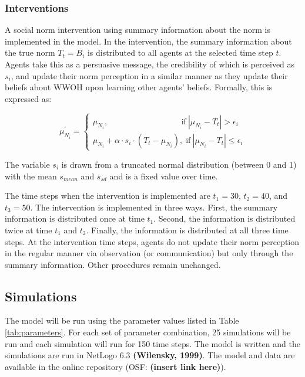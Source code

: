 \documentclass[
  11pt,
]{article}
\begin{document}
\hypertarget{interventions}{%
\subsubsection{Interventions}\label{interventions}}

A social norm intervention using summary information about the norm is
implemented in the model. In the intervention, the summary information
about the true norm \(T_t = \overline{B_i}\) is distributed to all
agents at the selected time step \(t\). Agents take this as a persuasive
message, the credibility of which is perceived as \(s_i\), and update
their norm perception in a similar manner as they update their beliefs
about WWOH upon learning other agents' beliefs. Formally, this is
expressed as:

\begin{equation}
  \mu_{N_i}^{\prime} = \begin{cases}
    \mu_{N_i}, \;\;\;\;\;\;\;\;\;\;\;\;\;\;\;\;\;\;\;\;\;\;\;\;\;\;\;\;\;\;\;\; \text{if} \: |\mu_{N_i} - T_t| > \epsilon_i \\
    \mu_{N_i} + \alpha \cdot s_i \cdot (T_t - \mu_{N_i}), \; \text{if} \: |\mu_{N_i} - T_t| \le \epsilon_i
  \end{cases}
\end{equation}

The variable \(s_i\) is drawn from a truncated normal distribution
(between 0 and 1) with the mean \(s_{mean}\) and \(s_{sd}\) and is a
fixed value over time.

The time steps when the intervention is implemented are \(t_1 = 30\),
\(t_2 = 40\), and \(t_3 = 50\). The intervention is implemented in three
ways. First, the summary information is distributed once at time
\(t_1\). Second, the information is distributed twice at time \(t_1\)
and \(t_2\). Finally, the information is distributed at all three time
steps. At the intervention time steps, agents do not update their norm
perception in the regular manner via observation (or communication) but
only through the summary information. Other procedures remain unchanged.

\hypertarget{simulations}{%
\subsection{Simulations}\label{simulations}}

The model will be run using the parameter values listed in Table
\ref{tab:parameters}. For each set of parameter combination, 25
simulations will be run and each simulation will run for 150 time steps.
The model is written and the simulations are run in NetLogo 6.3
\textbf{(Wilensky, 1999)}. The model and data are available in the
online repository (OSF: \textbf{(insert link here)}).
\end{document}
